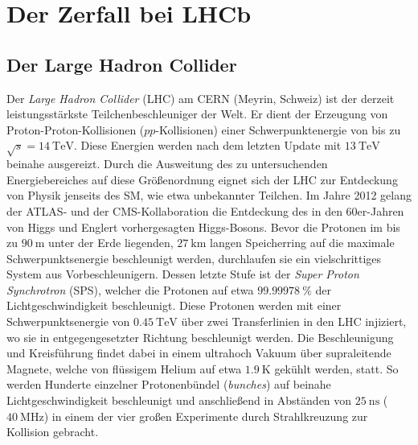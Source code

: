 \chapter{Der Zerfall bei LHCb}
%
\section{Der Large Hadron Collider}
%
Der \textit{Large Hadron Collider} (LHC) am CERN (Meyrin, Schweiz) ist der derzeit leistungsstärkste Teilchenbeschleuniger der Welt. Er dient der Erzeugung von Proton-Proton-Kollisionen ($pp$-Kollisionen) einer Schwerpunktenergie von bis zu $\sqrt{s}=\SI{14}{\tera\electronvolt}$\cite{lhc}. Diese Energien werden nach dem letzten Update mit $\SI{13}{\tera\electronvolt}$ beinahe ausgereizt\cite{lhc}. Durch die Ausweitung des zu untersuchenden Energiebereiches auf diese Größenordnung eignet sich der LHC zur Entdeckung von Physik jenseits des SM, wie etwa unbekannter Teilchen. Im Jahre 2012 gelang der ATLAS- und der CMS-Kollaboration die Entdeckung des in den 60er-Jahren von Higgs und Englert vorhergesagten Higgs-Bosons\cite{higgs}.
Bevor die Protonen im bis zu $\SI{90}{\meter}$ unter der Erde liegenden, $\SI{27}{\kilo\meter}$ langen Speicherring auf die maximale Schwerpunktsenergie beschleunigt werden, durchlaufen sie ein vielschrittiges System aus Vorbeschleunigern. Dessen letzte Stufe ist der \textit{Super Proton Synchrotron} (SPS), welcher die Protonen auf etwa $\SI{99,99978}{\percent}$ der Lichtgeschwindigkeit beschleunigt\cite{lhc}. Diese Protonen werden mit einer Schwerpunktsenergie von $\SI{0,45}{\tera\electronvolt}$ über zwei Transferlinien in den LHC injiziert, wo sie in entgegengesetzter Richtung beschleunigt werden. Die Beschleunigung und Kreisführung findet dabei in einem ultrahoch Vakuum über supraleitende Magnete, welche von flüssigem Helium auf etwa $\SI{1,9}{\kelvin}$ gekühlt werden, statt. So werden Hunderte einzelner Protonenbündel (\textit{bunches}) auf beinahe Lichtgeschwindigkeit beschleunigt und anschließend in Abständen von $\SI{25}{\nano\second}$ ($\SI{40}{\mega\hertz}$) in einem der vier großen Experimente durch Strahlkreuzung zur Kollision gebracht.
%
